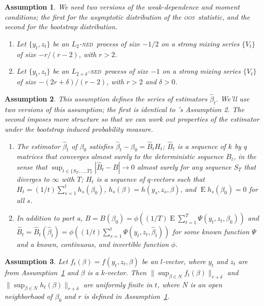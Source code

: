 \documentclass[12pt]{article}
\newcommand\citepos[2][]{\citeauthor{#2}'s \citeyearpar[#1]{#2}}
\newtheorem{asmp}{Assumption}[section]
\theoremstyle{definition}
\DeclareMathOperator{\E}{E}
\newcommand{\ned}{\textsc{ned}}
\newcommand{\oos}{\textsc{oos}}
\begin{document}
\begin{asmp}\label{asmp:a1}  We need two versions of the weak-dependence and moment
  conditions; the first for the asymptotic distribution of the \oos\
  statistic, and the second for the bootstrap distribution.
  \begin{enumerate}
  \item[a.] Let $\{y_t, z_t\}$ be an $L_2$-\ned\ process of size $-1/2$ on
    a strong mixing series $\{V_t\}$ of size $-r/(r-2)$, with $r > 2$.
  \item[b.] Let $\{y_t, z_t\}$ be an $L_{2+\delta}$-\ned\ process of
    size $-1$ on a strong mixing series $\{V_t\}$ of size $-(2r +
    \delta)/(r - 2)$, with $r > 2$ and $\delta > 0$.
  \end{enumerate}
\end{asmp}

\begin{asmp}\label{asmp:a2}  This assumption defines the series of
  estimators $\hat{\beta}_t$.  We'll use two versions of this
  assumption; the first is identical to \citepos{Wes:96} Assumption 2.
  The second imposes more structure so that we can work out properties
  of the estimator under the bootstrap induced probability measure.
  \begin{enumerate}
  \item[a.] The estimator $\hat{\beta}_t$ of $\beta_0$ satisfies
    $\hat{\beta}_{t} - \beta_{0} = \hat{B}_{t} H_t$;
    $\hat{B}_{t}$ is a sequence of $k$ by $q$ matrices that converges
    almost surely to the deterministic sequence $B_{t}$, in the sense
    that $\sup_{t \in \{S_T,\dots,T\}} | \hat{B}_{t} - B | \to 0$
    almost surely for any sequence $S_T$ that diverges to $\infty$
    with $T$; $H_{t}$ is a sequence of $q$-vectors such that $H_{t}
    = (1/t) \sum_{s=1}^t h_{s}(\beta_{0})$, $h_{s}(\beta) =
    h(y_{s}, z_{s}, \beta)$, and $\E h_{s}(\beta_{0}) = 0$ for all
    $s$.
  \item[b.] In addition to part a, $B = B(\beta_{0}) =
    \phi((1/T) \E \sum_{t=1}^T \Psi(y_{t}, z_{t},
    \beta_{0}))$ and $\hat{B}_{t} =
    \hat{B}_{t}(\hat{\beta}_{t}) = \phi((1/t) \sum_{s=1}^t \Psi(y_{t},
    z_{t}, \hat{\beta}_{t}))$ for some known function $\Psi$ and
    a known, continuous, and invertible function $\phi$.
  \end{enumerate}
\end{asmp}

\begin{asmp}\label{asmp:a3}
  Let $f_{t}(\beta) = f(y_{t}, z_{t}, \beta)$ be an $l$-vector, where
  $y_{t}$ and $z_{t}$ are from Assumption~\ref{asmp:a1} and $\beta$ is
  a $k$-vector.  Then $\| \sup_{\beta \in N} f_{t}(\beta)
  \|_{r+\delta}$ and $\| \sup_{\beta \in N} h_{t}(\beta)
  \|_{r+\delta}$ are uniformly finite in $t$, where $N$ is an open
  neighborhood of $\beta_{0}$ and $r$ is defined in
  Assumption~\ref{asmp:a1}.
\end{asmp}
\end{document}
